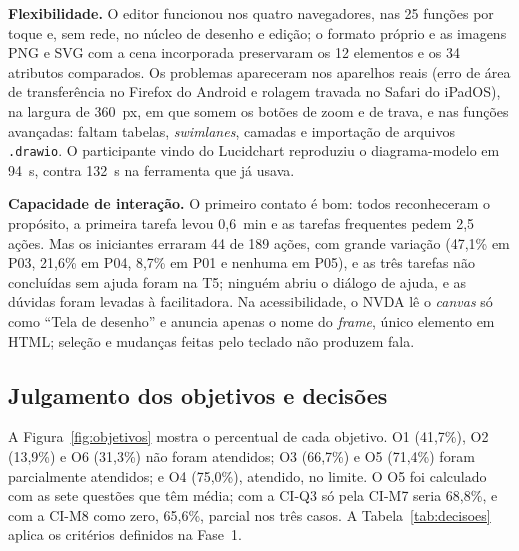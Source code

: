\documentclass[conference]{IEEEtran}
\begin{document}
\textbf{Flexibilidade.} O editor funcionou nos quatro navegadores, nas 25
funções por toque e, sem rede, no núcleo de desenho e edição; o formato
próprio e as imagens PNG e SVG com a cena incorporada preservaram os 12
elementos e os 34 atributos comparados. Os problemas apareceram nos
aparelhos reais (erro de área de transferência no Firefox do Android e
rolagem travada no Safari do iPadOS), na largura de 360~px, em que somem os
botões de zoom e de trava, e nas funções avançadas: faltam tabelas,
\textit{swimlanes}, camadas e importação de arquivos \texttt{.drawio}. O
participante vindo do Lucidchart reproduziu o diagrama-modelo em 94~s,
contra 132~s na ferramenta que já usava.

\textbf{Capacidade de interação.} O primeiro contato é bom: todos
reconheceram o propósito, a primeira tarefa levou 0,6~min e as tarefas
frequentes pedem 2,5 ações. Mas os iniciantes erraram 44 de 189 ações, com
grande variação (47,1\% em P03, 21,6\% em P04, 8,7\% em P01 e nenhuma em
P05), e as três tarefas não concluídas sem ajuda foram na T5; ninguém abriu
o diálogo de ajuda, e as dúvidas foram levadas à facilitadora. Na
acessibilidade, o NVDA lê o \textit{canvas} só como ``Tela de desenho'' e
anuncia apenas o nome do \textit{frame}, único elemento em HTML; seleção e
mudanças feitas pelo teclado não produzem fala.

\subsection{Julgamento dos objetivos e decisões}
\label{sec:julgamento}

A Figura~\ref{fig:objetivos} mostra o percentual de cada objetivo. O1
(41,7\%), O2 (13,9\%) e O6 (31,3\%) não foram atendidos; O3 (66,7\%) e O5
(71,4\%) foram parcialmente atendidos; e O4 (75,0\%), atendido, no limite. O
O5 foi calculado com as sete questões que têm média; com a CI-Q3 só pela
CI-M7 seria 68,8\%, e com a CI-M8 como zero, 65,6\%, parcial nos três casos.
A Tabela~\ref{tab:decisoes} aplica os critérios definidos na Fase~1.
\end{document}
